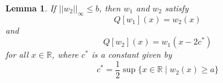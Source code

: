 \documentclass[11pt]{article}
\newtheorem{lem}[thm]{Lemma}
\theoremstyle{definition}
\numberwithin{equation}{section}
\numberwithin{thm}{section}
\renewcommand{\a}{a}
\renewcommand{\b}{b}
\begin{document}
\begin{lem} \label{lemmamain}
If $ || w_2 ||_\infty \leq \b $, then $w_1$ and $w_2$ satisfy
\begin{equation}
Q[w_1](x) = w_2(x)
\end{equation}
and
\begin{equation}
Q[w_2](x) = w_1(x-2c^*)
\end{equation}
for all $x\in\mathbb R$, where $c^*$ is a constant given by
\begin{equation} \label{c}
c^* = \frac{1}{2} \sup\{x\in\mathbb R\mid w_2(x)\geq \a\}
\end{equation}
\end{lem}

%
%
\end{document}
